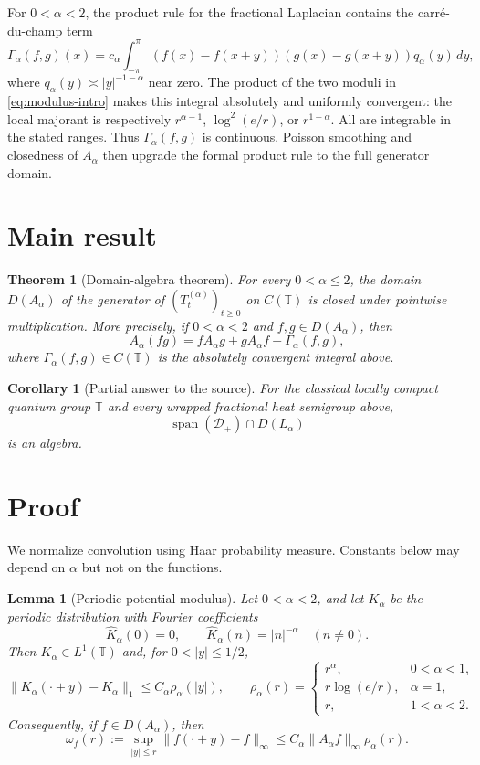 \documentclass[11pt]{article}
\newtheorem{theorem}{Theorem}
\newtheorem{lemma}{Lemma}
\newtheorem{corollary}{Corollary}
\theoremstyle{remark}
\newcommand{\T}{\mathbb T}
\newcommand{\D}{\mathcal D}
\newcommand{\wh}{\widehat}
\begin{document}
For $0<\alpha<2$, the product rule for the fractional Laplacian contains the
carr\'e-du-champ term
\[
 \Gamma_\alpha(f,g)(x)
 =c_\alpha\int_{-\pi}^{\pi}
   (f(x)-f(x+y))(g(x)-g(x+y))q_\alpha(y)\,dy,
\]
where $q_\alpha(y)\asymp |y|^{-1-\alpha}$ near zero.  The product of the two
moduli in \eqref{eq:modulus-intro} makes this integral absolutely and
uniformly convergent: the local majorant is respectively
$r^{\alpha-1}$, $\log^2(e/r)$, or $r^{1-\alpha}$. All are integrable in the
stated ranges. Thus $\Gamma_\alpha(f,g)$ is continuous. Poisson smoothing and
closedness of $A_\alpha$ then upgrade the formal product rule to the full
generator domain.

\section{Main result}

\begin{theorem}[Domain-algebra theorem]
\label{thm:main}
For every $0<\alpha\le2$, the domain $D(A_\alpha)$ of the generator of
$(T_t^{(\alpha)})_{t\ge0}$ on $C(\T)$ is closed under pointwise
multiplication. More precisely, if $0<\alpha<2$ and $f,g\in D(A_\alpha)$,
then
\[
 A_\alpha(fg)
 =fA_\alpha g+gA_\alpha f-\Gamma_\alpha(f,g),
\tag{2}\label{eq:product}
\]
where $\Gamma_\alpha(f,g)\in C(\T)$ is the absolutely convergent integral
above.
\end{theorem}

\begin{corollary}[Partial answer to the source]
\label{cor:source}
For the classical locally compact quantum group $\T$ and every wrapped
fractional heat semigroup above,
\[
               \operatorname{span}(\D_+)\cap D(L_\alpha)
\]
is an algebra.
\end{corollary}

\section{Proof}

We normalize convolution using Haar probability measure. Constants below may
depend on $\alpha$ but not on the functions.

\begin{lemma}[Periodic potential modulus]
\label{lem:kernel}
Let $0<\alpha<2$, and let $K_\alpha$ be the periodic distribution with
Fourier coefficients
\[
 \wh K_\alpha(0)=0,
 \qquad \wh K_\alpha(n)=|n|^{-\alpha}\quad(n\ne0).
\]
Then $K_\alpha\in L^1(\T)$ and, for $0<|y|\le1/2$,
\[
 \|K_\alpha(\cdot+y)-K_\alpha\|_1
 \le C_\alpha\rho_\alpha(|y|),
 \qquad
 \rho_\alpha(r)=
 \begin{cases}
 r^\alpha,&0<\alpha<1,\\
 r\log(e/r),&\alpha=1,\\
 r,&1<\alpha<2.
 \end{cases}
\tag{3}\label{eq:kernelmod}
\]
Consequently, if $f\in D(A_\alpha)$, then
\[
 \omega_f(r):=\sup_{|y|\le r}\|f(\cdot+y)-f\|_\infty
 \le C_\alpha\|A_\alpha f\|_\infty\rho_\alpha(r).
\tag{4}\label{eq:fmod}
\]
\end{lemma}
\end{document}
